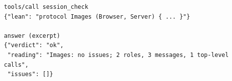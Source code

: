 \begin{lstlisting}[language={},basicstyle=\ttfamily\footnotesize,breaklines=true]
tools/call session_check
{"lean": "protocol Images (Browser, Server) { ... }"}

answer (excerpt)
{"verdict": "ok",
 "reading": "Images: no issues; 2 roles, 3 messages, 1 top-level calls",
 "issues": []}
\end{lstlisting}
